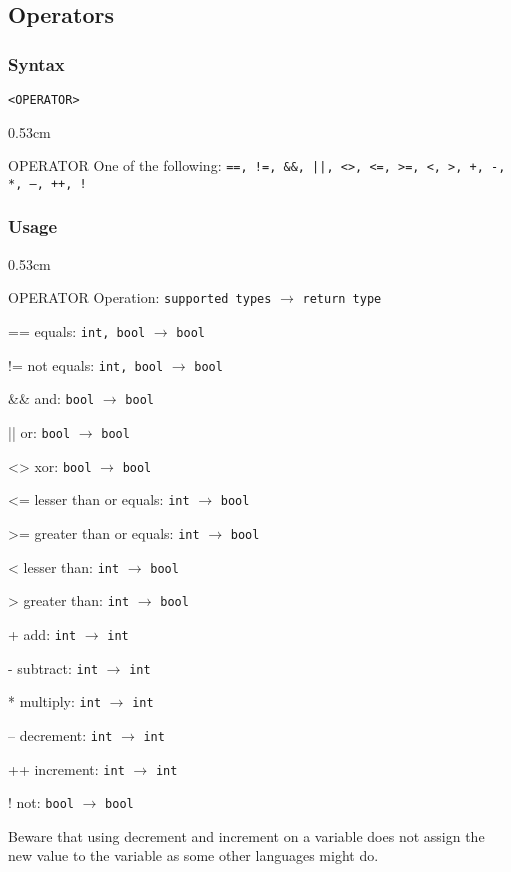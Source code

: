 \documentclass[twoside]{report}
\newenvironment{mycompactdesc}{\begin{adjustwidth}{0.53cm}{}\begin{compactdesc}}{\end{compactdesc}\end{adjustwidth}}
\begin{document}
\subsection{Operators}
\label{def:operators}
\subsubsection*{Syntax}
\texttt{<OPERATOR>}
\begin{mycompactdesc}
	\item[OPERATOR] One of the following: \texttt{==, !=, \&\&, ||, <>, <=, >=, <, >, +, -, *, --, ++, !}
\end{mycompactdesc}
\subsubsection*{Usage}
\begin{mycompactdesc}
	\item[OPERATOR] Operation: \texttt{supported types} $\rightarrow$ \texttt{return type}
	\item[==] equals: \texttt{int, bool} $\rightarrow$ \texttt{bool}
	\item[!=] not equals: \texttt{int, bool} $\rightarrow$ \texttt{bool}
	\item[\&\&] and: \texttt{bool} $\rightarrow$ \texttt{bool}
	\item[||] or: \texttt{bool} $\rightarrow$ \texttt{bool}
	\item[<>] xor: \texttt{bool} $\rightarrow$ \texttt{bool}
	\item[<=] lesser than or equals: \texttt{int} $\rightarrow$ \texttt{bool}
	\item[>=] greater than or equals: \texttt{int} $\rightarrow$ \texttt{bool}
	\item[<] lesser than: \texttt{int} $\rightarrow$ \texttt{bool}
	\item[>] greater than: \texttt{int} $\rightarrow$ \texttt{bool}
	\item[+] add: \texttt{int} $\rightarrow$ \texttt{int}
	\item[-] subtract: \texttt{int} $\rightarrow$ \texttt{int}
	\item[*] multiply: \texttt{int} $\rightarrow$ \texttt{int}
	\item[--] decrement: \texttt{int} $\rightarrow$ \texttt{int}
	\item[++] increment: \texttt{int} $\rightarrow$ \texttt{int}
	\item[!] not: \texttt{bool} $\rightarrow$ \texttt{bool}
\end{mycompactdesc}
Beware that using decrement and increment on a variable does not assign the new value to the variable as some other languages might do.
\end{document}
